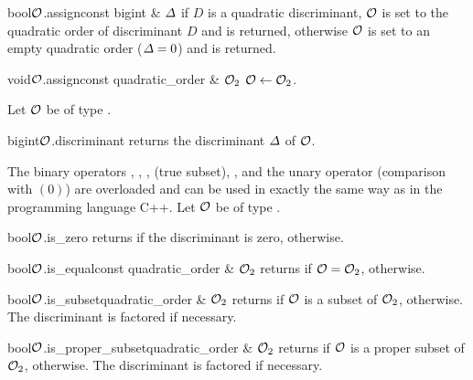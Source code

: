 \begin{fcode}{bool}{$\mathcal{O}$.assign}{const bigint & $\varDelta$}
  if $D$ is a quadratic discriminant, $\mathcal{O}$ is set to the quadratic order of discriminant $D$
  and \TRUE is returned, otherwise $\mathcal{O}$ is set to an empty quadratic order ($\varDelta = 0$) and
  \FALSE is returned.
\end{fcode}

\begin{fcode}{void}{$\mathcal{O}$.assign}{const quadratic_order & $\mathcal{O}_2$}
  $\mathcal{O} \leftarrow \mathcal{O}_2$.
\end{fcode}



\ACCS

Let $\mathcal{O}$ be of type .

\begin{cfcode}{bigint}{$\mathcal{O}$.discriminant}{}
  returns the discriminant $\varDelta$ of $\mathcal{O}$.
\end{cfcode}



\COMP

The binary operators \code{==}, \code{!=}, \code{<=}, \code{<} (true subset), \code{>=},
\code{>} and the unary operator \code{!} (comparison with $(0)$) are overloaded and can be used
in exactly the same way as in the programming language C++.  Let $\mathcal{O}$ be of type
.

\begin{cfcode}{bool}{$\mathcal{O}$.is_zero}{}
  returns \TRUE if the discriminant is zero, \FALSE otherwise.
\end{cfcode}

\begin{cfcode}{bool}{$\mathcal{O}$.is_equal}{const quadratic_order & $\mathcal{O}_2$}
  returns \TRUE if $\mathcal{O} = \mathcal{O}_2$, \FALSE otherwise.
\end{cfcode}

\begin{fcode}{bool}{$\mathcal{O}$.is_subset}{quadratic_order & $\mathcal{O}_2$}
  returns \TRUE if $\mathcal{O}$ is a subset of $\mathcal{O}_2$, \FALSE otherwise.  The discriminant is factored
  if necessary.
\end{fcode}

\begin{fcode}{bool}{$\mathcal{O}$.is_proper_subset}{quadratic_order & $\mathcal{O}_2$}
  returns \TRUE if $\mathcal{O}$ is a proper subset of $\mathcal{O}_2$, \FALSE otherwise.  The discriminant is
  factored if necessary.
\end{fcode}


